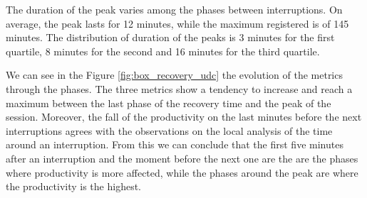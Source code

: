 \documentclass[times]{smrauth}
\begin{document}
The duration of the peak varies among the phases between interruptions. On average, the peak lasts for 12 minutes, while the maximum registered is of 145 minutes. The distribution of duration of the peaks is 3 minutes for the first quartile, 8 minutes for the second and 16 minutes for the third quartile.  %



We can see in the Figure \ref{fig:box_recovery_udc} the evolution of the metrics through
the phases. The three metrics show a tendency to increase and reach a maximum between the last phase of the recovery time and the peak of the session. Moreover, the fall of the productivity on the last minutes before the next interruptions agrees with the observations on the local analysis of the time around an interruption. From this we can conclude that the first five minutes after an interruption and the moment before the next one are the are the phases where productivity is more affected, while the phases around the peak are where the productivity is the highest.
\end{document}
